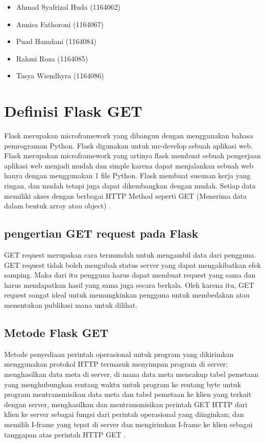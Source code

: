 \begin{itemize}
\item Ahmad Syafrizal Huda (1164062)
\item Annisa Fathoroni (1164067)
\item Puad Hamdani (1164084)
\item Rahmi Roza (1164085)
\item Tasya Wiendhyra (1164086)
\end{itemize}

\section{Definisi Flask GET}
Flask merupakan microframework yang dibangun dengan menggunakan bahasa pemrograman Python. Flask digunakan untuk me-develop sebuah aplikasi web. Flask merupakan microframework yang artinya flask membuat sebuah pengerjaan aplikasi web menjadi mudah dan simple karena dapat menjalankan sebuah web hanya dengan menggunakan 1 file Python. Flask membuat susunan kerja yang ringan, dan mudah tetapi juga dapat dikembangkan dengan mudah. Setiap data memiliki akses dengan berbagai HTTP Method seperti GET (Menerima data dalam bentuk array atau object) \cite{gunawan2018aplikasi}.
\subsection{pengertian GET request pada Flask}
GET request merupakan cara termundah untuk mengambil data dari pengguna. GET request tidak boleh mengubah status server yang dapat mengakibatkan efek samping.  Maka dari itu pengguna harus dapat membuat request yang sama dan harus mendapatkan hasil yang sama juga secara berkala. Oleh karena itu, GET request sangat ideal untuk memungkinkan pengguna untuk membedakan atau menentukan publikasi mana untuk dilihat\cite{dwyer2016flask}.
\subsection{Metode Flask GET}
Metode penyediaan perintah operasional untuk program  yang dikirimkan menggunakan protokol HTTP termasuk menyimpan program  di server; menghasilkan data meta di server, di mana data meta mencakup tabel pemetaan yang menghubungkan rentang waktu untuk program  ke rentang byte untuk program  mentransmisikan data meta dan tabel pemetaan ke klien yang terkait dengan server, menghasilkan dan mentransmisikan perintah GET HTTP dari klien  ke server sebagai fungsi dari perintah operasional yang diinginkan; dan memilih I-frame yang tepat di server dan mengirimkan I-frame ke klien sebagai tanggapan atas perintah HTTP GET \cite{xu2006method}.

